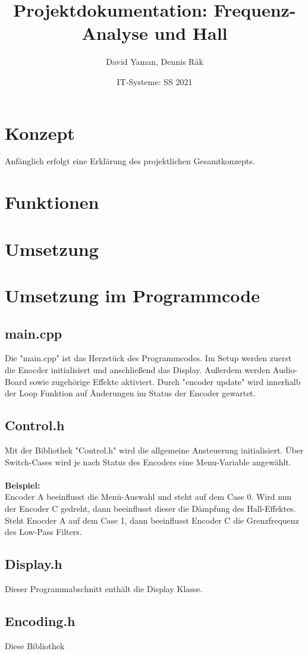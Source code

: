 \documentclass[12pt]{article}
\title{Projektdokumentation: Frequenz-Analyse und Hall}        %
\author{David Yaman, Dennis Räk}            %
\date{IT-Systeme: SS 2021}                    %
\begin{document}
\maketitle
\newpage
\section{Konzept}
Anfänglich erfolgt eine Erklärung des projektlichen Gesamtkonzepts.
\section{Funktionen}
\section{Umsetzung}
\section{Umsetzung im Programmcode}
\subsection{main.cpp}
Die "main.cpp" ist das Herzstück des Programmcodes. Im Setup werden zuerst die Enocder initialisiert und anschließend das Display. 
Außerdem werden Audio-Board sowie zugehörige Effekte aktiviert. 
Durch "encoder update" wird innerhalb der Loop Funktion auf Änderungen im Status der Encoder gewartet.
\subsection{Control.h}
Mit der Bibliothek "Control.h" wird die allgemeine Ansteuerung initialisiert. Über Switch-Cases wird je nach Status des Encoders eine Menu-Variable angewählt. 
\\
\\
\textbf{Beispiel:}
\\
Encoder A beeinflusst die Menü-Auswahl und steht auf dem Case 0. Wird nun der Encoder C gedreht, dann beeinflusst dieser die Dämpfung des Hall-Effektes.
Steht Enocder A auf dem Case 1, dann beeinflusst Encoder C die Grenzfrequenz des Low-Pass Filters.
\subsection{Display.h}
Dieser Programmabschnitt enthält die Display Klasse. 
\subsection{Encoding.h}
Diese Bibliothek
\end{document}
